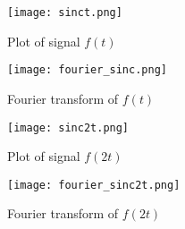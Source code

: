\documentclass[journal,12pt,twocolumn]{IEEEtran}
\begin{document}
\begin{figure}[h]
\centering
\texttt{[image: sinct.png]}
\caption{Plot of signal $f(t)$}
\label{fig:hyperbola}
\end{figure}
\begin{figure}[h]
\centering
\texttt{[image: fourier\_sinc.png]}
\caption{Fourier transform of $f(t)$}
\label{fig:hyperbola}
\end{figure}
\begin{figure}[h]
\centering
\texttt{[image: sinc2t.png]}
\caption{Plot of signal $f(2t)$}
\label{fig:hyperbola}
\end{figure}
\begin{figure}[h]
\centering
\texttt{[image: fourier\_sinc2t.png]}
\caption{Fourier transform of $f(2t)$}
\label{fig:hyperbola}
\end{figure}
\end{document}
